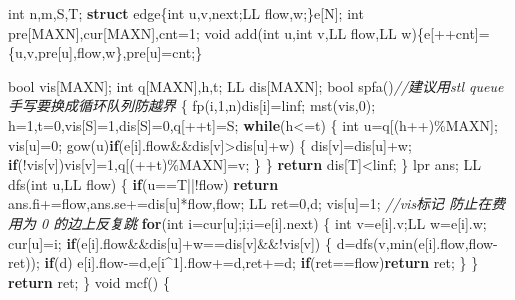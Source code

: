 \documentclass[
]{article}
\newenvironment{Shaded}{}{}
\newcommand{\CommentTok}[1]{\textcolor[rgb]{0.38,0.63,0.69}{\textit{#1}}}
\newcommand{\ControlFlowTok}[1]{\textcolor[rgb]{0.00,0.44,0.13}{\textbf{#1}}}
\newcommand{\DataTypeTok}[1]{\textcolor[rgb]{0.56,0.13,0.00}{#1}}
\newcommand{\DecValTok}[1]{\textcolor[rgb]{0.25,0.63,0.44}{#1}}
\newcommand{\KeywordTok}[1]{\textcolor[rgb]{0.00,0.44,0.13}{\textbf{#1}}}
\newcommand{\NormalTok}[1]{#1}
\begin{document}
\begin{Shaded}
\begin{Highlighting}[]
\DataTypeTok{int}\NormalTok{ n,m,S,T;}
\KeywordTok{struct}\NormalTok{ edge\{}\DataTypeTok{int}\NormalTok{ u,v,next;LL flow,w;\}e[N];}
\DataTypeTok{int}\NormalTok{ pre[MAXN],cur[MAXN],cnt=}\DecValTok{1}\NormalTok{;}
\DataTypeTok{void}\NormalTok{ add(}\DataTypeTok{int}\NormalTok{ u,}\DataTypeTok{int}\NormalTok{ v,LL flow,LL w)\{e[++cnt]=\{u,v,pre[u],flow,w\},pre[u]=cnt;\}}

\DataTypeTok{bool}\NormalTok{ vis[MAXN];}
\DataTypeTok{int}\NormalTok{ q[MAXN],h,t; LL dis[MAXN];}
\DataTypeTok{bool}\NormalTok{ spfa()}\CommentTok{//建议用stl queue 手写要换成循环队列防越界}
\NormalTok{\{}
\NormalTok{    fp(i,}\DecValTok{1}\NormalTok{,n)dis[i]=linf; mst(vis,}\DecValTok{0}\NormalTok{);}
\NormalTok{    h=}\DecValTok{1}\NormalTok{,t=}\DecValTok{0}\NormalTok{,vis[S]=}\DecValTok{1}\NormalTok{,dis[S]=}\DecValTok{0}\NormalTok{,q[++t]=S;}
    \ControlFlowTok{while}\NormalTok{(h\textless{}=t)}
\NormalTok{    \{}
        \DataTypeTok{int}\NormalTok{ u=q[(h++)\%MAXN]; vis[u]=}\DecValTok{0}\NormalTok{; }
\NormalTok{        gow(u)}\ControlFlowTok{if}\NormalTok{(e[i].flow\&\&dis[v]\textgreater{}dis[u]+w)}
\NormalTok{        \{}
\NormalTok{            dis[v]=dis[u]+w;}
            \ControlFlowTok{if}\NormalTok{(!vis[v])vis[v]=}\DecValTok{1}\NormalTok{,q[(++t)\%MAXN]=v;}
\NormalTok{        \}}
\NormalTok{    \}}
    \ControlFlowTok{return}\NormalTok{ dis[T]\textless{}linf;}
\NormalTok{\}}
\NormalTok{lpr ans;}
\NormalTok{LL dfs(}\DataTypeTok{int}\NormalTok{ u,LL flow)}
\NormalTok{\{}
    \ControlFlowTok{if}\NormalTok{(u==T||!flow) }\ControlFlowTok{return}\NormalTok{ ans.fi+=flow,ans.se+=dis[u]*flow,flow;}
\NormalTok{    LL ret=}\DecValTok{0}\NormalTok{,d; vis[u]=}\DecValTok{1}\NormalTok{; }\CommentTok{//vis标记 防止在费用为 0 的边上反复跳}
    \ControlFlowTok{for}\NormalTok{(}\DataTypeTok{int}\NormalTok{ i=cur[u];i;i=e[i].next)}
\NormalTok{    \{}
        \DataTypeTok{int}\NormalTok{ v=e[i].v;LL w=e[i].w; cur[u]=i;}
        \ControlFlowTok{if}\NormalTok{(e[i].flow\&\&dis[u]+w==dis[v]\&\&!vis[v])}
\NormalTok{        \{}
\NormalTok{            d=dfs(v,min(e[i].flow,flow{-}ret));}
            \ControlFlowTok{if}\NormalTok{(d) e[i].flow{-}=d,e[i\^{}}\DecValTok{1}\NormalTok{].flow+=d,ret+=d;}
            \ControlFlowTok{if}\NormalTok{(ret==flow)}\ControlFlowTok{return}\NormalTok{ ret;}
\NormalTok{        \}}
\NormalTok{    \}}
    \ControlFlowTok{return}\NormalTok{ ret;}
\NormalTok{\}}
\DataTypeTok{void}\NormalTok{ mcf()}
\NormalTok{\{}

\end{Highlighting}
\end{Shaded}
\end{document}
